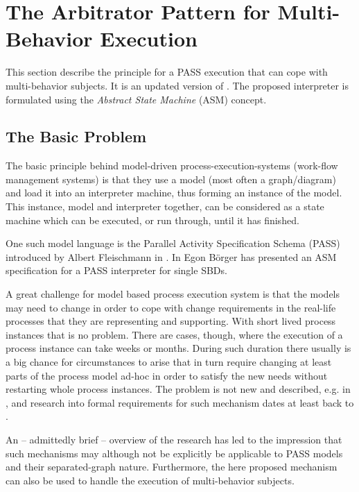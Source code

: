 \newpage
\section{The Arbitrator Pattern for Multi-Behavior Execution}
\label{sec:ArbitratorPatternForPASSExecution}

This section describe the principle for a PASS execution that can cope with multi-behavior subjects. It is an updated version of \cite{elster:arbitrator}. The proposed interpreter is formulated using the \textit{Abstract State Machine} (ASM) concept.

\subsection{The Basic Problem}

The basic principle behind model-driven process-execution-systems (work-flow management systems) is that they use a model (most often a graph/diagram) and load it into an interpreter machine, thus forming an instance of the model. This instance, model and interpreter together, can be considered as a state machine which can be executed, or run through, until it has finished. 

One such model language is the Parallel Activity Specification Schema (PASS) introduced by Albert Fleischmann in \cite{book:Flei94}. In \cite{boerger2011interpreter} Egon Börger has presented an ASM specification for a PASS interpreter for single SBDs. 

A great challenge for model based process execution system is that the models may need to change in order to cope with change requirements in the real-life processes that they are representing and supporting. With short lived process instances that is no problem. There are cases, though, where the execution of a process instance can take weeks or months. During such duration there usually is a big chance for circumstances to arise that in turn require changing at least parts of the process model ad-hoc in order to satisfy the new needs without restarting whole process instances.
The problem is not new and described, e.g. in \cite{dadam:adept}, and research into formal requirements for such mechanism dates at least back to \cite{reichert:adeptflex}. 

An – admittedly brief – overview of the research has led to the impression that such mechanisms may although not be explicitly be applicable to PASS models and their separated-graph nature. Furthermore, the here proposed mechanism can also be used to handle the execution of multi-behavior subjects.

